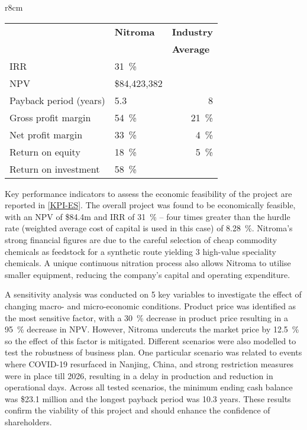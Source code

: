 \begin{wraptable}{r}{8cm}
\centering
\caption{Nitroma's KPIs compared to the industry average}
\label{KPI-ES}
\begin{tabular}{@{}l|l|l@{}}
\toprule
           &  \multicolumn{1}{l|}{\textbf{Nitroma}} & \multicolumn{1}{c}{\textbf{Industry}} \\
                     & \multicolumn{1}{l|}{}        & \textbf{Average}                      \\ \midrule

IRR                  & \SI{31}{\percent}                         &                              \\
NPV                  & \$84,423,382                 &                              \\
Payback period (years)       & 5.3                          & \multicolumn{1}{r}{8}      \\
Gross profit margin  & \SI{54}{\percent}                         & \multicolumn{1}{r}{\SI{21}{\percent}}   \\
Net profit margin    & \SI{33}{\percent}                         & \multicolumn{1}{r}{\SI{4}{\percent}}    \\
Return on equity     & \SI{18}{\percent}                         & \multicolumn{1}{r}{\SI{5}{\percent}}   \\
Return on investment & \SI{58}{\percent}                         &                              \\ \bottomrule
\end{tabular}
\end{wraptable}

Key performance indicators to assess the economic feasibility of the project are reported in \cref{KPI-ES}. The overall project was found to be economically feasible, with an NPV of \$84.4m and IRR of \SI{31}{\percent} – four times greater than the hurdle rate (weighted average cost of capital is used in this case) of \SI{8.28}{\percent}. Nitroma’s strong financial figures are due to the careful selection of cheap commodity chemicals as feedstock for a synthetic route yielding 3 high-value speciality chemicals. A unique continuous nitration process also allows Nitroma to utilise smaller equipment, reducing the company’s capital and operating expenditure.

A sensitivity analysis was conducted on 5 key variables to investigate the effect of changing macro- and micro-economic conditions. Product price was identified as the most sensitive factor, with a \SI{30}{\percent} decrease in product price resulting in a \SI{95}{\percent} decrease in NPV. However, Nitroma undercuts the market price by \SI{12.5}{\percent} so the effect of this factor is mitigated. Different scenarios were also modelled to test the robustness of business plan. One particular scenario was related to events where COVID-19 resurfaced in Nanjing, China, and strong restriction measures were in place till 2026, resulting in a delay in production and reduction in operational days. Across all tested scenarios, the minimum ending cash balance was \$23.1 million and the longest payback period was 10.3 years. These results confirm the viability of this project and should enhance the confidence of shareholders.